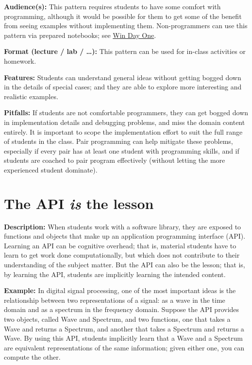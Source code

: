 \documentclass[]{book}
\begin{document}
\textbf{Audience(s):} This pattern requires students to have some
comfort with programming, although it would be possible for them to get
some of the benefit from seeing examples without implementing them.
Non-programmers can use this pattern via prepared notebooks; see
\protect\hyperlink{win-day-one}{Win Day One}.

\textbf{Format (lecture / lab / \ldots{}):} This pattern can be used for
in-class activities or homework.

\textbf{Features:} Students can understand general ideas without getting
bogged down in the details of special cases; and they are able to
explore more interesting and realistic examples.

\textbf{Pitfalls:} If students are not comfortable programmers, they can
get bogged down in implementation details and debugging problems, and
miss the domain content entirely. It is important to scope the
implementation effort to suit the full range of students in the class.
Pair programming can help mitigate these problems, especially if every
pair has at least one student with programming skills, and if students
are coached to pair program effectively (without letting the more
experienced student dominate).

\section{\texorpdfstring{The API \emph{is} the
lesson}{The API is the lesson}}\label{the-api-is-the-lesson}

\textbf{Description:} When students work with a software library, they
are exposed to functions and objects that make up an application
programming interface (API). Learning an API can be cognitive overhead;
that is, material students have to learn to get work done
computationally, but which does not contribute to their understanding of
the subject matter. But the API can also be the lesson; that is, by
learning the API, students are implicitly learning the intended content.

\textbf{Example:} In digital signal processing, one of the most
important ideas is the relationship between two representations of a
signal: as a wave in the time domain and as a spectrum in the frequency
domain. Suppose the API provides two objects, called Wave and Spectrum,
and two functions, one that takes a Wave and returns a Spectrum, and
another that takes a Spectrum and returns a Wave. By using this API,
students implicitly learn that a Wave and a Spectrum are equivalent
representations of the same information; given either one, you can
compute the other.
\end{document}
